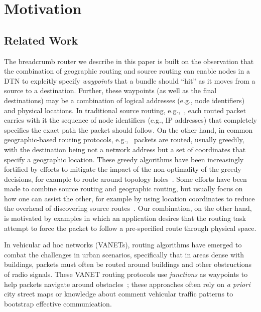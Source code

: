 \section{Motivation}
\subsection{Related Work}
The {\sc breadcrumb} router we describe in this paper is built on the observation that the combination of geographic routing and source routing can enable nodes in a DTN to explcitly specify {\em waypoints} that a bundle should ``hit'' as it moves from a source to a destination. Further, these waypoints (as well as the final destinations) may be a combination of logical addresses (e.g., node identifiers) and physical locations. In traditional source routing, e.g.,~\cite{johnson96:dynamic}, each routed packet carries with it the sequence of node identifiers (e.g., IP addresses) that completely specifies the exact path the packet should follow. On the other hand, in common geographic-based routing protocols, e.g.,~\cite{florian13:overdrive, karp00:gpsr, navas97:geocast} packets are routed, usually greedily, with the destination being not a network address but a set of coordinates that specify a geographic location. These greedy algorithms have been increasingly fortified by efforts to mitigate the impact of the non-optimality of the greedy decisions, for example to route around topology holes~\cite{tian03:spatially}. Some efforts have been made to combine source routing and geographic routing, but usually focus on how one can assist the other, for example by using location coordinates to reduce the overhead of discovering source routes~\cite{basagni99:dynamic}. Our combination, on the other hand, is motivated by examples in which an application desires that the routing task attempt to force the packet to follow a pre-specified route through physical space.

In vehicular ad hoc networks (VANETs), routing algorithms have emerged to combat the challenges in urban scenarios, specifically that in areas dense with buildings, packets must often be routed around buildings and other obstructions of radio signals. These VANET routing protocols use {\em junctions} as waypoints to help packets navigate around obstacles~\cite{jerbi07:improved, lochert05:geographic}; these approaches often rely on {\em a priori} city street maps or knowledge about comment vehicular traffic patterns to bootstrap effective communication.

